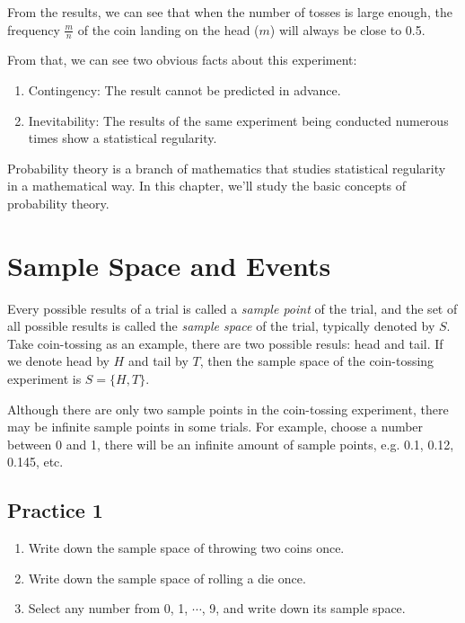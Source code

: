 \documentclass{report}
\begin{document}
\begin{multicols}{2}
  From the results, we can see that when the number of tosses is large enough,
  the frequency $\frac{m}{n}$ of the coin landing on the head ($m$) will always
  be close to 0.5.

  From that, we can see two obvious facts about this experiment:
  \begin{enumerate}
    \item Contingency: The result cannot be predicted in advance.
    \item Inevitability: The results of the same experiment being conducted numerous
          times show a statistical regularity.
  \end{enumerate}

  Probability theory is a branch of mathematics that studies statistical
  regularity in a mathematical way. In this chapter, we'll study the basic
  concepts of probability theory.

  \section{Sample Space and Events}

  Every possible results of a trial is called a \emph{sample point} of the trial,
  and the set of all possible results is called the \emph{sample space} of the
  trial, typically denoted by $S$. Take coin-tossing as an example, there are two
  possible resuls: head and tail. If we denote head by $H$ and tail by $T$, then
  the sample space of the coin-tossing experiment is $S = \{H, T\}$.

  Although there are only two sample points in the coin-tossing experiment, there
  may be infinite sample points in some trials. For example, choose a number
  between 0 and 1, there will be an infinite amount of sample points, e.g. 0.1,
  0.12, 0.145, etc.

  \subsection{Practice 1}

  \begin{enumerate}
    \item Write down the sample space of throwing two coins once.

    \item Write down the sample space of rolling a die once.

    \item Select any number from 0, 1, $\cdots$, 9, and write down its sample space.


\end{enumerate}
\end{multicols}
\end{document}
